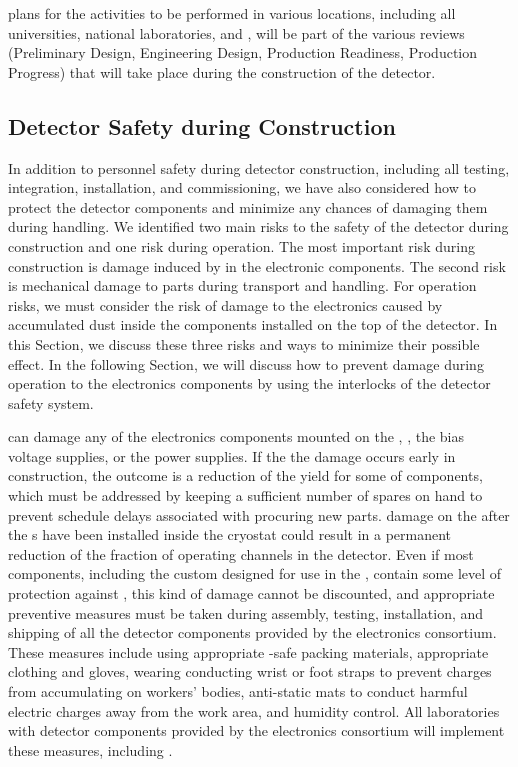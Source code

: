  plans for the activities to be performed in various
locations, including all universities, national laboratories,
and , will be part of the 
various reviews (Preliminary Design, Engineering Design, Production 
Readiness, Production Progress) that will take place during the construction of the detector.

\subsection{Detector Safety during Construction}
\label{sec:fdsp-tpcelec-safety-detcon}


In addition to personnel safety during detector
construction, including all testing, 
integration, installation, and commissioning, we have also
considered how to protect the detector
components and minimize any chances of damaging
them during handling. We identified two main risks 
to the safety of the detector during construction and one risk during
operation. The most important risk during construction is damage 
induced by  in the 
electronic components. The second risk is mechanical damage to 
parts during transport and handling. For operation risks, we
must consider the risk of damage to the electronics 
caused by accumulated dust inside the components
installed on the top of the detector. In this Section, 
we discuss these three risks and ways to minimize their possible 
effect. In the following Section, we will discuss how to prevent
damage during operation to the  electronics components 
by using the interlocks of the detector safety system.

 can damage any of the electronics
components mounted on the , ,
the bias voltage supplies, or the power supplies. If the
the damage occurs early in construction, 
the outcome is a reduction
of the yield for some of components, which must be
addressed by keeping a sufficient number of spares on hand to prevent
schedule delays associated with procuring new parts. 
damage on the  after the s have been
installed inside the cryostat could result in a permanent
reduction of the fraction of operating channels in the
detector. Even if most components, including the custom 
 designed for use in the , contain 
some level of protection  against , this kind of damage cannot be discounted, and appropriate 
preventive measures must be taken during  
assembly, testing, installation, and shipping of all the detector 
components provided by the  electronics consortium. These 
measures include using appropriate -safe packing materials, 
appropriate clothing and gloves, wearing conducting wrist or foot straps 
to prevent charges from accumulating 
on workers' bodies, anti-static mats to conduct harmful electric 
charges away from the work area, and humidity control. All laboratories with detector components provided by the  electronics consortium will implement these
measures, including . 

